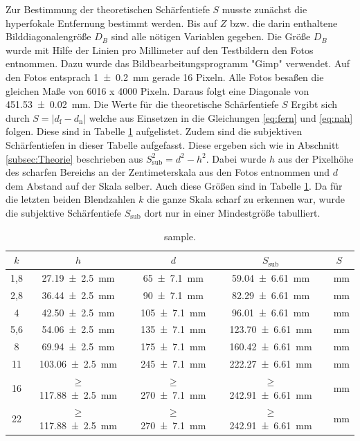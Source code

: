 		Zur Bestimmung der theoretischen Schärfentiefe $S$ musste zunächst die hyperfokale Entfernung bestimmt werden.
		Bis auf $Z$ bzw. die darin enthaltene Bilddiagonalengröße $D_B$ sind alle nötigen Variablen gegeben.
		Die Größe $D_B$ wurde mit Hilfe der Linien pro Millimeter auf den Testbildern den Fotos entnommen.
		Dazu wurde das Bildbearbeitungsprogramm "Gimp"\cite{Gimp} verwendet.
		Auf den Fotos entsprach \SI{1+-0,2}{\milli\meter} gerade 16 Pixeln.
		Alle Fotos besaßen die gleichen Maße von 6016 x 4000 Pixeln.
		Daraus folgt eine Diagonale von \SI{451,53+-0,02}{\milli\meter}.
		Die Werte für die theoretische Schärfentiefe $S$ Ergibt sich durch $S = |d_\text{f}-d_\text{n}|$ welche aus Einsetzen in die Gleichungen \ref{eq:fern} und \ref{eq:nah} folgen.
		Diese sind in Tabelle \ref{tab:Schärfentiefe} aufgelistet.
		Zudem sind die subjektiven Schärfentiefen in dieser Tabelle aufgefasst.
		Diese ergeben sich wie in Abschnitt \ref{subsec:Theorie} beschrieben aus $S_\text{sub}^2 = d^2 - h^2$.
		Dabei wurde $h$ aus der Pixelhöhe des scharfen Bereichs an der Zentimeterskala aus den Fotos entnommen und $d$ dem Abstand auf der Skala selber.
		Auch diese Größen sind in Tabelle \ref{tab:Schärfentiefe}.
		Da für die letzten beiden Blendzahlen $k$ die ganze Skala scharf zu erkennen war, wurde die subjektive Schärfentiefe $S_\text{sub}$ dort nur in einer Mindestgröße tabulliert.
		
		\begin{table}[ht]
			\centering
			\begin{tabular}{c|c|c|c|c}
				$k$ & $h$ & $d$ & $S_\text{sub}$ & $S$ \\
				\hline
				1,8 & \SI{27,19+-2,5}{\milli\meter} & \SI{65+-7,1}{\milli\meter} & \SI{59,04+-6,61}{\milli\meter} & \SI{}{\milli\meter} \\
				2,8 & \SI{36,44+-2,5}{\milli\meter} & \SI{90+-7,1}{\milli\meter} & \SI{82,29+-6,61}{\milli\meter} & \SI{}{\milli\meter} \\
				4 & \SI{42,50+-2,5}{\milli\meter} & \SI{105+-7,1}{\milli\meter} & \SI{96,01+-6,61}{\milli\meter} & \SI{}{\milli\meter} \\
				5,6 & \SI{54,06+-2,5}{\milli\meter} & \SI{135+-7,1}{\milli\meter} & \SI{123,70+-6,61}{\milli\meter} & \SI{}{\milli\meter} \\
				8 & \SI{69,94+-2,5}{\milli\meter} & \SI{175+-7,1}{\milli\meter} & \SI{160,42+-6,61}{\milli\meter} & \SI{}{\milli\meter} \\
				11 & \SI{103,06+-2,5}{\milli\meter} & \SI{245+-7,1}{\milli\meter} & \SI{222,27+-6,61}{\milli\meter} & \SI{}{\milli\meter} \\
				16 & $\geq$ \SI{117,88+-2,5}{\milli\meter} & $\geq$ \SI{270+-7,1}{\milli\meter} & $\geq$ \SI{242,91+-6,61}{\milli\meter} & \SI{}{\milli\meter} \\
				22 & $\geq$ \SI{117,88+-2,5}{\milli\meter} & $\geq$ \SI{270+-7,1}{\milli\meter} & $\geq$ \SI{242,91+-6,61}{\milli\meter} & \SI{}{\milli\meter} \\
			\end{tabular}
			\caption{sample.}
			\label{tab:Schärfentiefe}
		\end{table}
	
